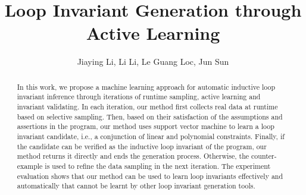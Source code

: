 \documentclass{llncs}
\begin{document}
\title{Loop Invariant Generation through Active Learning}
\author{
Jiaying Li, Li Li, Le Guang Loc, Jun Sun\\
}

\maketitle

\begin{abstract}
    In this work, we propose a machine learning approach for automatic inductive loop invariant inference 
    through iterations of runtime sampling, active learning and invariant validating. 
    In each iteration, our method first collects real data at runtime based on selective sampling. 
    Then, based on their satisfaction of the assumptions and assertions in the program, 
    our method uses support vector machine to learn a loop invariant candidate, 
    i.e., a conjunction of linear and polynomial constraints. 
    Finally, if the candidate can be verified as the inductive loop invariant of the program, 
    our method returns it directly and ends the generation process. 
    Otherwise, the counter-example is used to refine the data sampling in the next iteration. 
    The experiment evaluation shows that our method can be used to learn loop invariants 
    effectively and automatically that cannot be learnt by other loop invariant generation tools. 
\end{abstract}












\end{document}
